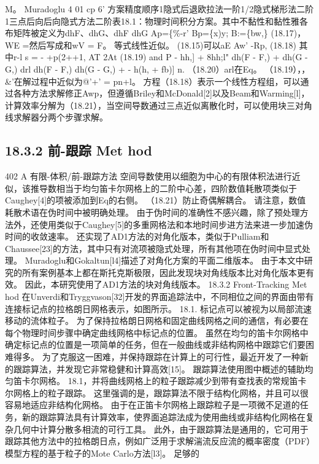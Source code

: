 \documentclass[UTF8,11pt,a4paper,openany,fontset=fandol]{ctexbook}
\begin{document}
M。 Muradoglu 4 01 cp 6' 方案精度顺序1隐式后退欧拉法一阶1/2隐式梯形法二阶1三点后向后向隐式方法二阶表18.1：物理时间积分方案。其中不黏性和黏性雅各布矩阵被定义为dhF、dhG、dhF dhG Ap=\{\%-r' Bp=\{x)y; B:=\{bw,\} (18.17)，WE =然后写成和wV = F。 等式线性近似。 (18.15)可以aE Aw' -Rp, (18.18) 其中r-l s = - +p(2++1, AT 2At (18.19) and P - hh,] + 8hh;l" dh(F - F,) + dh(G - G,) drl dh(F - F,) dh(G - G,) + - h(h, + fb)] n. （18.20）arl在Eq。 （18.19），，\&'在解过程中近似为@'+' = pn+l。 方程（18.18）表示一个线性方程组，可以通过各种方法求解修正Awp，但遵循Briley和McDonald[2]以及Beam和Warming[l]，计算效率分解为（18.21），当空间导数通过三点近似离散化时，可以使用块三对角线求解器分两个步骤求解。

\subsection{18.3.2 前-跟踪 Met hod}
402 A 有限-体积/前-跟踪方法 空间导数使用以细胞为中心的有限体积法进行近似，该推导数相当于均匀笛卡尔网格上的二阶中心差，四阶数值耗散项类似于Caughey[4]的项被添加到Eq的右侧。 （18.21）防止奇偶解耦合。 请注意，数值耗散术语在伪时间中被明确处理。 由于伪时间的准确性不感兴趣，除了预处理方法外，还使用类似于Caughey[5]的多重网格法和本地时间步进方法来进一步加速伪时间的收敛速率。 还实现了AD1方法的对角化版本，类似于Pulliam和Chaussee[23]的方法，其中只有对流项被隐式处理，所有其他项在伪时间中显式处理。 Muradoglu和Gokaltun[l4]描述了对角化方案的平面二维版本。 由于本文中研究的所有案例基本上都在斯托克斯极限，因此发现块对角线版本比对角化版本更有效。 因此，本研究使用了AD1方法的块对角线版本。 18.3.2 Front-Tracking Met hod 在Unverdi和Tryggvason[32]开发的界面追踪法中，不同相位之间的界面由带有连接标记点的拉格朗日网格表示，如图所示。 18.1. 标记点可以被视为以局部流速移动的流体粒子。 为了保持拉格朗日网格和固定曲线网格之间的通信，有必要在每个物理时间步骤中确定曲线网格中标记点的位置。 虽然在均匀的笛卡尔网格中确定标记点的位置是一项简单的任务，但在一般曲线或非结构网格中跟踪它们要困难得多。 为了克服这一困难，并保持跟踪在计算上的可行性，最近开发了一种新的跟踪算法，并发现它非常稳健和计算高效[15]。 跟踪算法使用图中概述的辅助均匀笛卡尔网格。 18.1，并将曲线网格上的粒子跟踪减少到带有查找表的常规笛卡尔网格上的粒子跟踪。 这里强调的是，跟踪算法不限于结构化网格，并且可以很容易地适应非结构化网格。 由于在正笛卡尔网格上跟踪粒子是一项微不足道的任务，新的跟踪算法具有计算效率，使界面追踪法成为使用曲线或非结构化网格在复杂几何中计算分散多相流的可行工具。 此外，由于跟踪算法是通用的，它可用于跟踪其他方法中的拉格朗日点，例如广泛用于求解湍流反应流的概率密度（PDF）模型方程的基于粒子的Mote Carlo方法[l3]。 足够的
\end{document}
